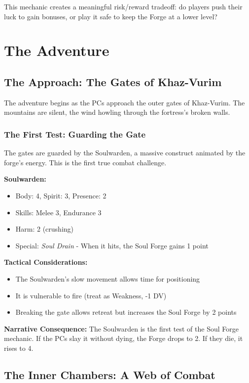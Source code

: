 \documentclass[11pt]{article}
\begin{document}
This mechanic creates a meaningful risk/reward tradeoff: do players push their luck to gain bonuses, or play it safe to keep the Forge at a lower level?

\section{The Adventure}

\subsection{The Approach: The Gates of Khaz-Vurim}

The adventure begins as the PCs approach the outer gates of Khaz-Vurim. The mountains are silent, the wind howling through the fortress's broken walls.

\subsubsection{The First Test: Guarding the Gate}

The gates are guarded by the Soulwarden, a massive construct animated by the forge's energy. This is the first true combat challenge.

\textbf{Soulwarden:}
\begin{itemize}
    \item Body: 4, Spirit: 3, Presence: 2
    \item Skills: Melee 3, Endurance 3
    \item Harm: 2 (crushing)
    \item Special: \textit{Soul Drain} - When it hits, the Soul Forge gains 1 point
\end{itemize}

\textbf{Tactical Considerations:}
\begin{itemize}
    \item The Soulwarden's slow movement allows time for positioning
    \item It is vulnerable to fire (treat as Weakness, -1 DV)
    \item Breaking the gate allows retreat but increases the Soul Forge by 2 points
\end{itemize}

\textbf{Narrative Consequence:} The Soulwarden is the first test of the Soul Forge mechanic. If the PCs slay it without dying, the Forge drops to 2. If they die, it rises to 4.

\subsection{The Inner Chambers: A Web of Combat}
\end{document}
